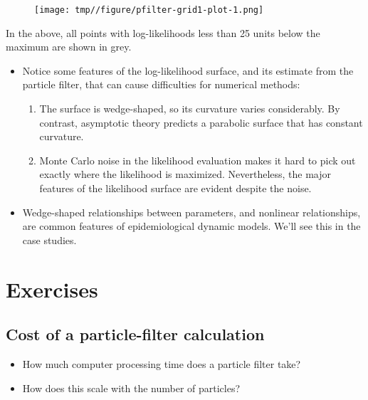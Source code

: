 \documentclass[
  letterpaper,
  DIV=11,
  numbers=noendperiod]{scrartcl}
\providecommand{\tightlist}{%
  \setlength{\itemsep}{0pt}\setlength{\parskip}{0pt}}\usepackage{longtable,booktabs,array}
\begin{document}
\framebreak

\begin{figure}[h!]

{\centering \texttt{[image: tmp//figure/pfilter-grid1-plot-1.png]}

}

\end{figure}

\framebreak

In the above, all points with log-likelihoods less than 25 units below
the maximum are shown in grey.

\begin{itemize}
\item
  Notice some features of the log-likelihood surface, and its estimate
  from the particle filter, that can cause difficulties for numerical
  methods:

  \begin{enumerate}
  \def\labelenumi{\arabic{enumi}.}
  \tightlist
  \item
    The surface is wedge-shaped, so its curvature varies considerably.
    By contrast, asymptotic theory predicts a parabolic surface that has
    constant curvature.
  \item
    Monte Carlo noise in the likelihood evaluation makes it hard to pick
    out exactly where the likelihood is maximized. Nevertheless, the
    major features of the likelihood surface are evident despite the
    noise.
  \end{enumerate}
\item
  Wedge-shaped relationships between parameters, and nonlinear
  relationships, are common features of epidemiological dynamic models.
  We'll see this in the case studies.
\end{itemize}

\hypertarget{exercises}{%
\section{Exercises}\label{exercises}}

\hypertarget{cost-of-a-particle-filter-calculation}{%
\subsection{Cost of a particle-filter
calculation}\label{cost-of-a-particle-filter-calculation}}

\begin{itemize}
\tightlist
\item
  How much computer processing time does a particle filter take?
\item
  How does this scale with the number of particles?
\end{itemize}
\end{document}
